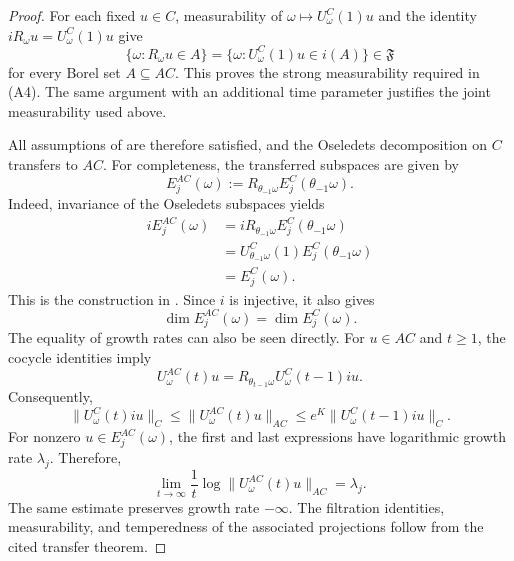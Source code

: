 \documentclass[reqno]{amsart}
\theoremstyle{plain}
\numberwithin{equation}{section}
\numberwithin{definition}{section}
\begin{document}
\begin{proof}
For each fixed $u\in C$, measurability of
$\omega\mapsto U_\omega^C(1)u$ and the identity
$iR_\omega u=U_\omega^C(1)u$ give
\begin{equation*}
    \{\omega:R_\omega u\in A\}
    =
    \{\omega:U_\omega^C(1)u\in i(A)\}
    \in\mathfrak F
\end{equation*}
for every Borel set $A\subseteq AC$.
This proves the strong measurability required in (A4).
The same argument with an additional time parameter
justifies the joint measurability used above.

All assumptions of
\cite[Theorem~3.6]{Kryspin2024}
are therefore satisfied, and the Oseledets decomposition
on $C$ transfers to $AC$. For completeness, the transferred subspaces are given by
\begin{equation*}
    E_j^{AC}(\omega)
    :=
    R_{\theta_{-1}\omega}E_j^C(\theta_{-1}\omega).
\end{equation*}
Indeed, invariance of the Oseledets subspaces yields
\begin{equation*}
    \begin{aligned}
        iE_j^{AC}(\omega)
        &=
        iR_{\theta_{-1}\omega}
        E_j^C(\theta_{-1}\omega)\\
        &=
        U_{\theta_{-1}\omega}^C(1)
        E_j^C(\theta_{-1}\omega)\\
        &=
        E_j^C(\omega).
    \end{aligned}
\end{equation*}
This is the construction in
\cite[Claim~3.4 and Theorem~3.6]{Kryspin2024}.
Since $i$ is injective, it also gives
\begin{equation*}
    \dim E_j^{AC}(\omega)=\dim E_j^C(\omega).
\end{equation*}
The equality of growth rates can also be seen directly.
For $u\in AC$ and $t\geq1$, the cocycle identities imply
\begin{equation*}
    U_\omega^{AC}(t)u
    =
    R_{\theta_{t-1}\omega}
    U_\omega^C(t-1)iu.
\end{equation*}
Consequently,
\begin{equation*}
    \|U_\omega^C(t)iu\|_C
    \leq
    \|U_\omega^{AC}(t)u\|_{AC}
    \leq
    e^K\|U_\omega^C(t-1)iu\|_C.
\end{equation*}
For nonzero $u\in E_j^{AC}(\omega)$, the first and last
expressions have logarithmic growth rate $\lambda_j$.
Therefore,
\begin{equation*}
    \lim_{t\to\infty}
    \frac{1}{t}\log\|U_\omega^{AC}(t)u\|_{AC}
    =
    \lambda_j.
\end{equation*}
The same estimate preserves growth rate $-\infty$.
The filtration identities, measurability, and temperedness
of the associated projections follow from the cited
transfer theorem.
\end{proof}
\end{document}
